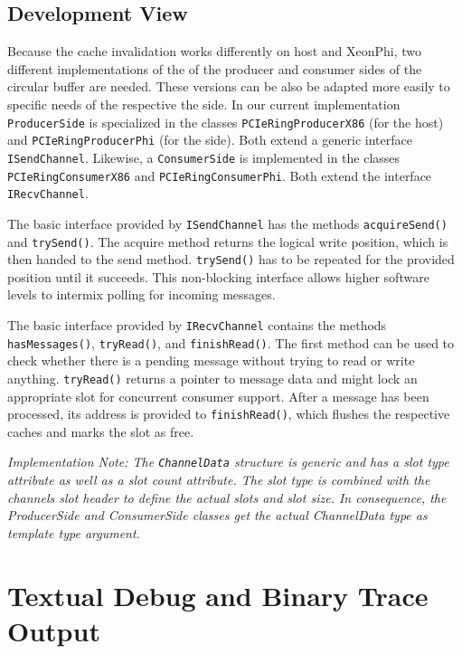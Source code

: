 \subsection{Development View}

Because the cache invalidation works differently on host and XeonPhi, two
different implementations of the of the producer and consumer sides of the
circular buffer are needed. These versions can be also be adapted more easily to
specific needs of the respective the side. In our current implementation
\texttt{ProducerSide} is specialized in the classes
\texttt{PCIeRingProducerX86} (for the host) and \texttt{PCIeRingProducerPhi}
(for the \mythos side). Both extend a generic interface \texttt{ISendChannel}.
Likewise, a \texttt{ConsumerSide} is implemented in the classes
\texttt{PCIeRingConsumerX86} and \texttt{PCIeRingConsumerPhi}. Both extend the
interface \texttt{IRecvChannel}.

The basic interface provided by \texttt{ISendChannel} has the methods
\texttt{acquireSend()} and \texttt{trySend()}. The acquire method returns the
logical write position, which is then handed to the send method.
\texttt{trySend()} has to be repeated for the provided position until it
succeeds. This non-blocking interface allows higher software levels to intermix
polling for incoming messages.
  
The basic interface provided by \texttt{IRecvChannel} contains the methods
\texttt{hasMessages()}, \texttt{tryRead()}, and \texttt{finishRead()}. The first
method can be used to check whether there is a pending message without trying to
read or write anything. \texttt{tryRead()} returns a pointer to message data and
might lock an appropriate slot for concurrent consumer support. After a message
has been processed, its address is provided to \texttt{finishRead()}, which
flushes the respective caches and marks the slot as free.

\emph{Implementation Note: The \texttt{ChannelData} structure is generic and has
a slot type attribute as well as a slot count attribute. The slot type is
combined with the channels slot header to define the actual slots and slot size.
In consequence, the ProducerSide and ConsumerSide classes get the actual
ChannelData type as template type argument.}

\section{Textual Debug and Binary Trace Output}
\label{sec:debug-channel}


